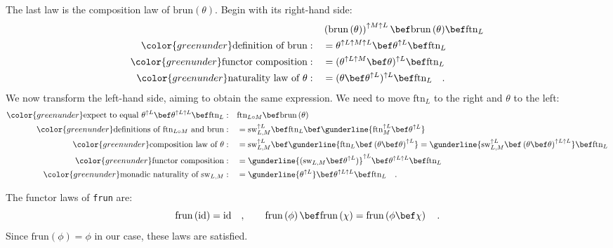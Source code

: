 The last law is the composition law of $\text{brun}\left(\theta\right)$.
Begin with its right-hand side:
\begin{align*}
 & \left(\text{brun}\,(\theta)\right)^{\uparrow M\uparrow L}\bef\text{brun}\,(\theta)\bef\text{ftn}_{L}\\
{\color{greenunder}\text{definition of }\text{brun}:}\quad & =\theta^{\uparrow L\uparrow M\uparrow L}\bef\theta^{\uparrow L}\bef\text{ftn}_{L}\\
{\color{greenunder}\text{functor composition}:}\quad & =(\theta^{\uparrow L\uparrow M}\bef\theta)^{\uparrow L}\bef\text{ftn}_{L}\\
{\color{greenunder}\text{naturality law of }\theta:}\quad & =(\theta\bef\theta^{\uparrow L})^{\uparrow L}\bef\text{ftn}_{L}\quad.
\end{align*}
We now transform the left-hand side, aiming to obtain the same expression.
We need to move $\text{ftn}_{L}$ to the right and $\theta$ to the
left: 
\begin{align*}
{\color{greenunder}\text{expect to equal }\theta^{\uparrow L}\bef\theta^{\uparrow L\uparrow L}\bef\text{ftn}_{L}:}\quad & \text{ftn}_{L\circ M}\bef\text{brun}\,(\theta)\\
{\color{greenunder}\text{definitions of }\text{ftn}_{L\circ M}\text{ and }\text{brun}:}\quad & =\text{sw}_{L,M}^{\uparrow L}\bef\text{ftn}_{L}\bef\gunderline{\text{ftn}_{M}^{\uparrow L}\bef\theta^{\uparrow L}}\\
{\color{greenunder}\text{composition law of }\theta:}\quad & =\text{sw}_{L,M}^{\uparrow L}\bef\gunderline{\text{ftn}_{L}\bef\left(\theta\bef\theta\right)^{\uparrow L}}=\gunderline{\text{sw}_{L,M}^{\uparrow L}\bef\left(\theta\bef\theta\right)^{\uparrow L\uparrow L}}\bef\text{ftn}_{L}\\
{\color{greenunder}\text{functor composition}:}\quad & =\gunderline{(\text{sw}_{L,M}\bef\theta^{\uparrow L})}^{\uparrow L}\bef\theta^{\uparrow L\uparrow L}\bef\text{ftn}_{L}\\
{\color{greenunder}\text{monadic naturality of }\text{sw}_{L,M}:}\quad & =\gunderline{\theta^{\uparrow L}}\bef\theta^{\uparrow L\uparrow L}\bef\text{ftn}_{L}\quad.
\end{align*}

The functor laws of \lstinline!frun! are:
\[
\text{frun}\left(\text{id}\right)=\text{id}\quad,\quad\quad\text{frun}\left(\phi\right)\bef\text{frun}\left(\chi\right)=\text{frun}\left(\phi\bef\chi\right)\quad.
\]
Since $\text{frun}\left(\phi\right)=\phi$ in our case, these laws
are satisfied.

